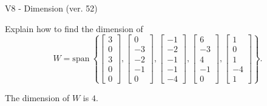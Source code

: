 \begin{exercise}
  \begin{exerciseTitle}V8 - Dimension (ver. 52)\end{exerciseTitle}
  \begin{exerciseStatement}
    Explain how to find the dimension of 
\[W=\mathrm{span}\ \left\{\left[\begin{array}{r}
3 \\
0 \\
3 \\
0 \\
0
\end{array}\right] , \left[\begin{array}{r}
0 \\
-3 \\
-2 \\
-1 \\
0
\end{array}\right] , \left[\begin{array}{r}
-1 \\
-2 \\
-1 \\
-1 \\
-4
\end{array}\right] , \left[\begin{array}{r}
6 \\
-3 \\
4 \\
-1 \\
0
\end{array}\right] , \left[\begin{array}{r}
1 \\
0 \\
1 \\
-4 \\
1
\end{array}\right]\right\}.\]



  \end{exerciseStatement}
  \begin{exerciseAnswer}
   The dimension of \(W\) is  \(4\).
  


  \end{exerciseAnswer}
\end{exercise}